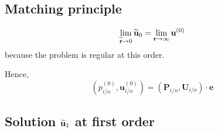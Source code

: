 \subsection{Matching principle}
\begin{equation}
    \lim_{\widetilde{\textbf{r}}\to 0} \widetilde{\textbf{u}}_0
    = \lim_{\textbf{r}\to \infty} \textbf{u}^{(0)}
\end{equation}
because the problem is regular at this order.

Hence,
\begin{equation}
    (p^{(0)}_{i/o}, \textbf{u}^{(0)}_{i/o}) = (\textbf{P}_{i/o}, \textbf{U}_{i/o}) \cdot \textbf{e}
\end{equation}

\subsection{Solution $\widetilde{\textbf{u}}_1$ at first order}

